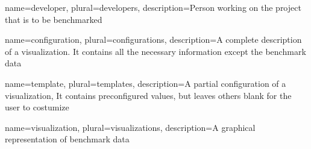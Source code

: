 \makenoidxglossaries

{
	name=developer,
	plural=developers,
	description={Person working on the project that is to be benchmarked}
}

{
	name=configuration,
	plural=configurations,
	description={A complete description of a \gls{visualization}. It contains all the necessary information except the benchmark data}
}

{
	name=template,
	plural=templates,
	description={A partial configuration of a \gls{visualization}, It contains preconfigured values, but leaves others blank for the user to costumize}
}

{
	name=visualization,
	plural=visualizations,
	description={A graphical representation of benchmark data}
}


